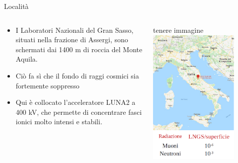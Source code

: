 \documentclass [xcolor=svgnames, 9pt] {beamer}
\begin{document}
	\begin{frame}[noframenumbering]{Località}
			\begin{columns}
					\begin{column}{0.5\textwidth}
							\begin{itemize}
									\item<1-> I Laboratori Nazionali del Gran Sasso, situati nella frazione di Assergi, sono schermati dai 1400 m di roccia del Monte Aquila.
									\item<2-> Ciò fa sì che il fondo di raggi cosmici sia fortemente soppresso
									\item<3-> Qui è collocato l'acceleratore LUNA2 a 400 kV, che permette di concentrare fasci ionici molto intensi e stabili.
								\end{itemize}
						\end{column}
					\begin{column}{0.5\textwidth}
			tenere immagine
							\centering
							\includegraphics[width=0.8\textwidth]{img/location.png}
						\end{column}
				\end{columns}
		\end{frame}
\end{document}
